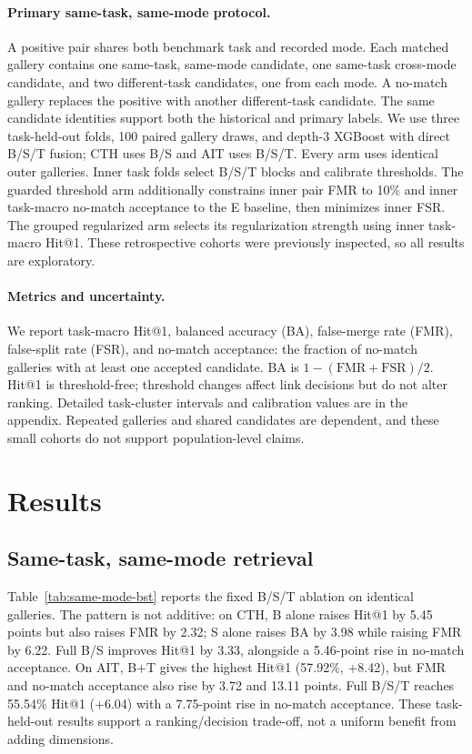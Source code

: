 \documentclass[10pt]{article}
\begin{document}
\paragraph{Primary same-task, same-mode protocol.} A positive pair shares both benchmark task and recorded mode. Each matched gallery contains one same-task, same-mode candidate, one same-task cross-mode candidate, and two different-task candidates, one from each mode. A no-match gallery replaces the positive with another different-task candidate. The same candidate identities support both the historical and primary labels. We use three task-held-out folds, 100 paired gallery draws, and depth-3 XGBoost with direct B/S/T fusion; CTH uses B/S and AIT uses B/S/T. Every arm uses identical outer galleries. Inner task folds select B/S/T blocks and calibrate thresholds. The guarded threshold arm additionally constrains inner pair FMR to 10\% and inner task-macro no-match acceptance to the E baseline, then minimizes inner FSR. The grouped regularized arm selects its regularization strength using inner task-macro Hit@1. These retrospective cohorts were previously inspected, so all results are exploratory.

\paragraph{Metrics and uncertainty.} We report task-macro Hit@1, balanced accuracy (BA), false-merge rate (FMR), false-split rate (FSR), and no-match acceptance: the fraction of no-match galleries with at least one accepted candidate. BA is $1-(\mathrm{FMR}+\mathrm{FSR})/2$. Hit@1 is threshold-free; threshold changes affect link decisions but do not alter ranking. Detailed task-cluster intervals and calibration values are in the appendix. Repeated galleries and shared candidates are dependent, and these small cohorts do not support population-level claims.

\section{Results}
\subsection{Same-task, same-mode retrieval}
Table~\ref{tab:same-mode-bst} reports the fixed B/S/T ablation on identical galleries. The pattern is not additive: on CTH, B alone raises Hit@1 by 5.45 points but also raises FMR by 2.32; S alone raises BA by 3.98 while raising FMR by 6.22. Full B/S improves Hit@1 by 3.33, alongside a 5.46-point rise in no-match acceptance. On AIT, B+T gives the highest Hit@1 (57.92\%, +8.42), but FMR and no-match acceptance also rise by 3.72 and 13.11 points. Full B/S/T reaches 55.54\% Hit@1 (+6.04) with a 7.75-point rise in no-match acceptance. These task-held-out results support a ranking/decision trade-off, not a uniform benefit from adding dimensions.

\end{document}
